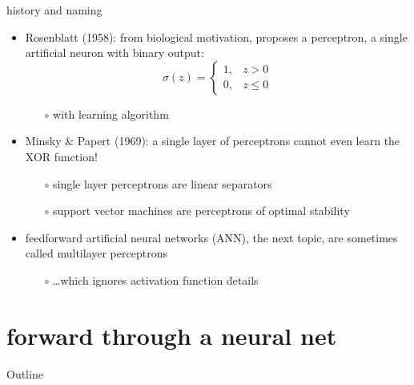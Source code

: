 \documentclass[xcolor={svgnames},
               hyperref={colorlinks,citecolor=DeepPink4,linkcolor=FireBrick,urlcolor=Maroon}]
               {beamer}
\begin{document}
\begin{frame}{history and naming}
\begin{itemize}
\item Rosenblatt (1958): from biological motivation, proposes a \alert{perceptron}, a single artificial neuron with binary output:
    $$\sigma(z) = \begin{cases} 1, & z > 0 \\ 0, & z \le 0 \end{cases}$$

    \begin{itemize}
    \item[$\circ$] with learning algorithm
    \end{itemize}
\item Minsky \& Papert (1969): a single layer of perceptrons cannot even learn the XOR function!
    \begin{itemize}
    \item[$\circ$] single layer perceptrons are linear separators
    \item[$\circ$] \alert{support vector machines} are perceptrons of optimal stability
    \end{itemize}
\item feedforward artificial neural networks (ANN), the next topic, are sometimes called \alert{multilayer perceptrons}
    \begin{itemize}
    \item[$\circ$] \dots which ignores activation function details
    \end{itemize}
\end{itemize}
\end{frame}


\section{forward through a neural net}

\begin{frame}{Outline}
\end{frame}
\end{document}
